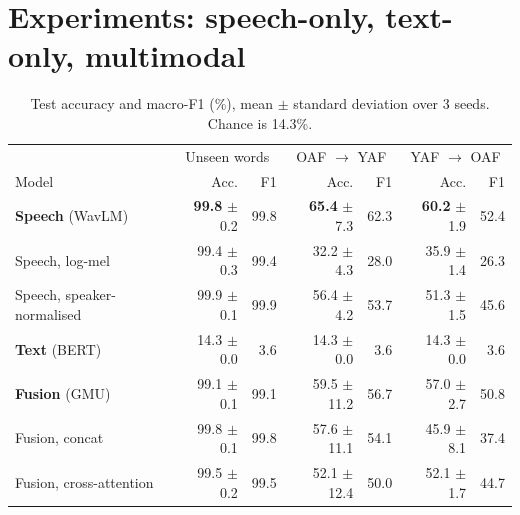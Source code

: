 \documentclass[11pt,a4paper]{article}
\begin{document}
\section{Experiments: speech-only, text-only, multimodal}
\label{sec:exp}
\begin{table}[H]\centering\small
\caption{Test accuracy and macro-F1 (\%), mean $\pm$ standard deviation over 3 seeds. Chance is 14.3\%.}
\label{tab:main}
\setlength{\tabcolsep}{4.5pt}
\begin{tabular}{@{}lrrrrrr@{}}
\toprule
 & \multicolumn{2}{c}{Unseen words} & \multicolumn{2}{c}{OAF $\to$ YAF} & \multicolumn{2}{c}{YAF $\to$ OAF} \\
Model & Acc. & F1 & Acc. & F1 & Acc. & F1 \\
\midrule
\textbf{Speech} (WavLM) & \textbf{99.8} $\pm$ 0.2 & 99.8 & \textbf{65.4} $\pm$ 7.3 & 62.3 & \textbf{60.2} $\pm$ 1.9 & 52.4 \\
Speech, log-mel & 99.4 $\pm$ 0.3 & 99.4 & 32.2 $\pm$ 4.3 & 28.0 & 35.9 $\pm$ 1.4 & 26.3 \\
Speech, speaker-normalised & 99.9 $\pm$ 0.1 & 99.9 & 56.4 $\pm$ 4.2 & 53.7 & 51.3 $\pm$ 1.5 & 45.6 \\
\textbf{Text} (BERT) & 14.3 $\pm$ 0.0 & 3.6 & 14.3 $\pm$ 0.0 & 3.6 & 14.3 $\pm$ 0.0 & 3.6 \\
\textbf{Fusion} (GMU) & 99.1 $\pm$ 0.1 & 99.1 & 59.5 $\pm$ 11.2 & 56.7 & 57.0 $\pm$ 2.7 & 50.8 \\
Fusion, concat & 99.8 $\pm$ 0.1 & 99.8 & 57.6 $\pm$ 11.1 & 54.1 & 45.9 $\pm$ 8.1 & 37.4 \\
Fusion, cross-attention & 99.5 $\pm$ 0.2 & 99.5 & 52.1 $\pm$ 12.4 & 50.0 & 52.1 $\pm$ 1.7 & 44.7 \\
\bottomrule
\end{tabular}
\end{table}
\end{document}
